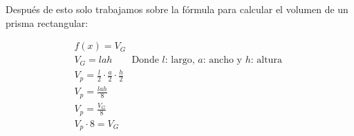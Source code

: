 Después de esto solo trabajamos sobre la fórmula para calcular el volumen de un prisma rectangular:

\begin{gather*}
    f(x) =  V_G \\
    V_G = lah \qquad \text{Donde $l$: largo, $a$: ancho y $h$: altura } \\
    V_p = \frac{l}{2} \cdot \frac{a}{2} \cdot \frac{h}{2}\\
    V_p = \frac{lah}{8}\\
    V_p = \frac{V_G}{8}\\
    V_p \cdot 8= V_G
\end{gather*}
